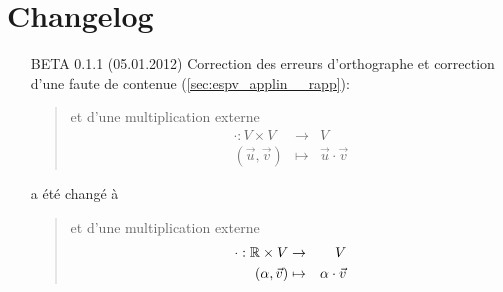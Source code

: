 \chapter{Changelog}
\begin{itemize}
  \item[BETA 0.1.1 (05.01.2012)] Correction des erreurs d'orthographe et correction d'une faute de contenue (\ref{sec:espv_applin__rapp}):
    \begin{quote}
      et d'une multiplication externe
      \begin{eqnarray*}
        \cdot: V \times V &\rightarrow& V \\
        (\vec{u}, \vec{v}) &\mapsto&  \vec{u} \cdot \vec{v}
      \end{eqnarray*}
    \end{quote}
    a été changé à
    \begin{quote}
      et d'une multiplication externe
      \begin{eqnarray*}
        \cdot: \mathbb{R} \times V &\rightarrow& V \\
        (\alpha, \vec{v}) &\mapsto& \alpha \cdot \vec{v}
      \end{eqnarray*}
    \end{quote}

\end{itemize}

